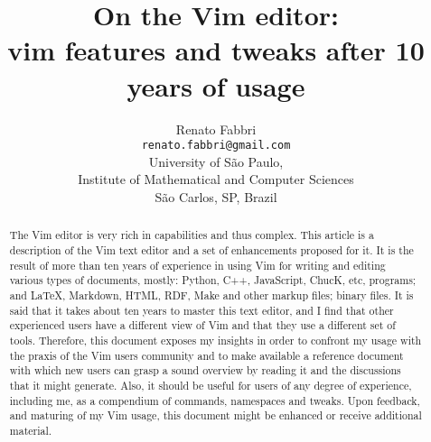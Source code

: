 \documentclass{article}
\begin{document}
\title{On the Vim editor:\\
vim features and tweaks after 10 years of usage}

\author{Renato Fabbri\\
\texttt{renato.fabbri@gmail.com}\\
University of São Paulo,\\
Institute of Mathematical and Computer Sciences\\
São Carlos, SP, Brazil
}
\maketitle
\begin{abstract}
The Vim editor is very rich in capabilities
and thus complex.
This article is a description of the Vim text editor
and a set of enhancements proposed for it.
It is the result of more than ten years of experience
in using Vim for writing and editing various types of documents,
mostly:
Python, C++, JavaScript, ChucK, etc, programs;
and \LaTeX, Markdown, HTML, RDF, Make and other markup files;
binary files.
It is said that it takes about ten years to master this
text editor, and I find that other experienced users
have a different view of Vim and that they use a different
set of tools.
Therefore, this document exposes my insights in order
to confront my usage with the praxis of the Vim users community
and to make available a reference document with which new users
can grasp a sound overview by reading it and the discussions that
it might generate.
Also, it should be useful for users of any degree of experience,
including me, as a compendium of commands, namespaces and tweaks.
Upon feedback, and maturing of my Vim usage,
this document might be enhanced or receive additional
material.
\end{abstract}
\end{document}

